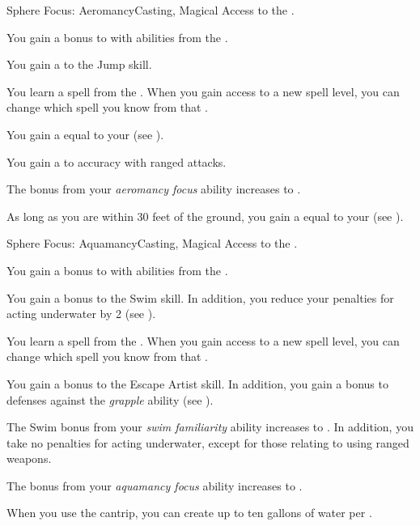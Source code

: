    \begin{feat}{Sphere Focus: Aeromancy}{Casting, Magical}
        \featpre Access to the  .

         You gain a  bonus to  with abilities from the  .

         You gain a   to the Jump skill.

         You learn a spell from the  .
        When you gain access to a new spell level, you can change which spell you know from that .

         You gain a  equal to your  (see ).

         You gain a   to accuracy with  ranged attacks.

         The bonus from your \textit{aeromancy focus} ability increases to .

         As long as you are within 30 feet of the ground, you gain a  equal to your  (see ).
    \end{feat}

    \begin{feat}{Sphere Focus: Aquamancy}{Casting, Magical}
        \featpre Access to the  .

         You gain a  bonus to  with abilities from the  .

         You gain a  bonus to the Swim skill.
        In addition, you reduce your penalties for acting underwater by 2 (see ).

         You learn a spell from the  .
        When you gain access to a new spell level, you can change which spell you know from that .

         You gain a  bonus to the Escape Artist skill.
        In addition, you gain a  bonus to defenses against the \textit{grapple} ability (see ).

         The Swim bonus from your \textit{swim familiarity} ability increases to .
        In addition, you take no penalties for acting underwater, except for those relating to using ranged weapons.

         The bonus from your \textit{aquamancy focus} ability increases to .

         When you use the  cantrip, you can create up to ten gallons of water per .
    \end{feat}

